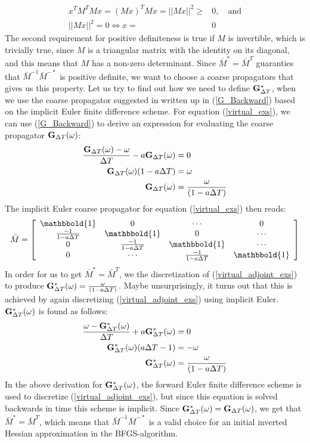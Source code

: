 \begin{align*}
x^TM^TMx=(Mx)^TMx=||Mx||^2\geq &0, \quad \textrm{and} \\
||Mx||^2=0 \iff x=&0
\end{align*}
The second requirement for positive definiteness is true if $M$ is invertible, which is trivially true, since $M$ is a triangular matrix with the identity on its diagonal, and this means that $M$ has a non-zero determinant. Since $\bar{M}^*=\bar{M}^T$ guaranties that $\bar{M}^{-1}\bar{M}^{-*}$ is positive definite, we want to choose a coarse propagators that gives us this property. Let us try to find out how we need to define $\bold G_{\Delta T}^*$, when we use the coarse propagator suggested in \cite{lions2001resolution} written up in (\ref{G_Backward}) based on the implicit Euler finite difference scheme. For equation (\ref{virtual_exs}), we can use (\ref{G_Backward}) to derive an expression for evaluating the coarse propagator $\bold G_{\Delta T}(\omega)$:
\begin{align}
\frac{\bold{G}_{\Delta T}(\omega) -\omega}{\Delta T } - a \bold{G}_{\Delta T}(\omega) &= 0 \\
\bold{G}_{\Delta T}(\omega)(1-a\Delta T)&= \omega \\
\bold{G}_{\Delta T}(\omega)&=\frac{\omega}{(1-a\Delta T)}
\end{align}
The implicit Euler coarse propagator for equation (\ref{virtual_exs}) then reads:
\begin{align*}
\bar M = \left[ \begin{array}{cccc}
   	\mathbbold{1} & 0 & \cdots & 0 \\  
   	\frac{-1}{1-a\Delta T} & \mathbbold{1} & 0 & \cdots \\ 
   	0 &\frac{-1}{1-a\Delta T} & \mathbbold{1}  & \cdots \\
   	0 &\cdots &\frac{-1}{1-a\Delta T} & \mathbbold{1}  \\
  	\end{array}  \right]
\end{align*}
In order for us to get $\bar{M}^*=\bar{M}^T$, we the discretization of (\ref{virtual_adjoint_exs}) to produce $\bold{G}_{\Delta T}^*(\omega)=\frac{\omega}{(1-a\Delta T)}$. Maybe unsurprisingly, it turns out that this is achieved by again discretizing (\ref{virtual_adjoint_exs}) using implicit Euler. $\bold{G}_{\Delta T}^*(\omega)$ is found as follows:
\begin{align*}
\frac{\omega-\bold{G}_{\Delta T}^*(\omega)}{\Delta T} + a \bold{G}_{\Delta T}^*(\omega)&=0 \\
\bold{G}_{\Delta T}^*(\omega)(a\Delta T-1)&=-\omega \\
\bold{G}_{\Delta T}^*(\omega)&=\frac{\omega}{(1-a\Delta T)}
\end{align*}
In the above derivation for $\bold{G}_{\Delta T}^*(\omega)$, the forward Euler finite difference scheme is used to discretize (\ref{virtual_adjoint_exs}), but since this equation is solved backwards in time this scheme is implicit. Since $\bold{G}_{\Delta T}^*(\omega)=\bold{G}_{\Delta T}(\omega)$, we get that $\bar{M}^*=\bar{M}^T$, which means that $\bar{M}^{-1}\bar{M}^{-*}$ is a valid choice for an initial inverted Hessian approximation in the BFGS-algorithm.
